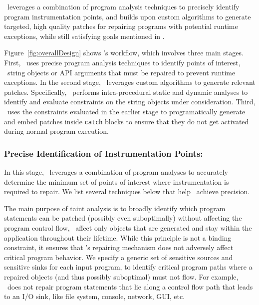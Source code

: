  \tool\ leverages a combination of program 
analysis techniques to precisely identify program instrumentation points, and
builds upon custom algorithms to generate targeted, high quality patches for
repairing programs with potential runtime exceptions, while still satisfying
goals mentioned in .

Figure~\ref{fig:overallDesign} shows \tool's workflow, which involves three
main stages. First, \tool\ uses precise program analysis techniques to identify
points of interest, \ie\ string objects or API arguments that must be repaired
to prevent runtime exceptions. In the second stage, \tool\ leverages custom
algorithms to generate relevant patches. Specifically, \tool\ performs
intra-procedural static and dynamic analyses to identify and evaluate
constraints on the string objects under consideration. Third, \tool\ uses the
constraints evaluated in the earlier stage to programatically generate and embed
patches inside \texttt{catch} blocks to ensure that they do not get activated
during normal program execution.

\subsubsection{Precise Identification of Instrumentation Points: }
\label{sec:tool:stage1}

In this stage, \tool\ leverages a combination of program analyses to accurately
determine the minimum set of points of interest where instrumentation is
required to repair. We list several techniques below that help \tool\ achieve
precision.

 The main purpose of taint analysis is to
broadly identify which program statements can be patched (possibly even
suboptimally) without affecting the program control flow, \ie\ affect only
objects that are generated and stay within the application throughout their
lifetime. While this principle is not a binding constraint, it ensures that
\tool's repairing mechanism does not adversely affect critical program behavior.
We specify a generic set of sensitive sources and sensitive sinks for each input
program, to identify critical program paths where a repaired 
objects (and thus possibly suboptimal) must not flow. For example, \tool\ does
not repair program statements that lie along a control flow path that leads to
an I/O sink, like file system, console, network, GUI, etc.

